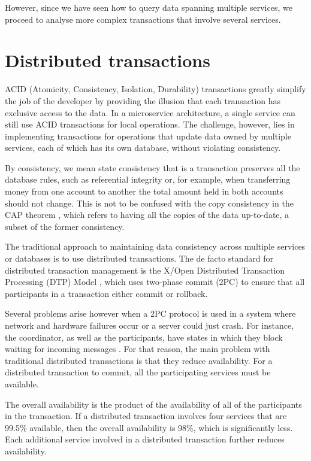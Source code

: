 \documentclass[conference]{IEEEtran}
\begin{document}
However, since we have seen how to query data spanning multiple services, we proceed to analyse more complex transactions that involve several services.

\section{Distributed transactions}

ACID (Atomicity, Consistency, Isolation, Durability) transactions greatly simplify the job of the developer by providing the illusion that each transaction has exclusive access to the data. In a microservice architecture, a single service can still use ACID transactions for local operations. The challenge, however, lies in implementing transactions for operations that update data owned by multiple services, each of which has its own database, without violating consistency.

By consistency, we mean state consistency that is a transaction preserves all the database rules, such as  referential integrity or, for example, when transferring money from one account to another the total amount held in both accounts should not change. This is not to be confused with the copy consistency in the CAP theorem \cite{acid-cap}, which refers to having all the copies of the data up-to-date, a subset of the former consistency.

The traditional approach to maintaining data consistency across multiple services or databases is to use distributed transactions. The de facto standard for distributed transaction management is the X/Open Distributed Transaction Processing (DTP) Model \cite{dtp}, which uses two-phase commit (2PC) to ensure that all participants in a transaction either commit or rollback. 

Several problems arise however when a 2PC protocol is used in a system where network and hardware failures occur or a server could just crash. For instance, the coordinator, as well as the participants, have states in which they block waiting for incoming messages \cite{distributed-systems-2pc}. For that reason, the main problem with traditional distributed transactions is that they reduce availability. For a distributed transaction to commit, all the participating services must be available.

The overall availability is the product of the availability of all of the participants in the transaction. If a distributed transaction involves four services that are 99.5\% available, then the overall availability is 98\%, which is significantly less. Each additional service involved in a distributed transaction further reduces availability.
\end{document}
